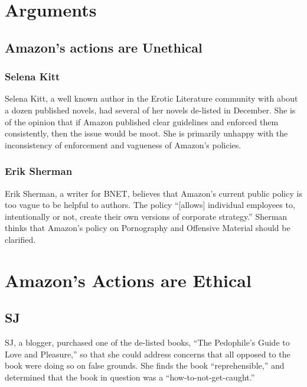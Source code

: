 \documentclass[11pt]{article}
\begin{document}
\begin{multicols}{2}

\section{Arguments}

\subsection{Amazon's actions are Unethical}

\subsubsection{Selena Kitt}
Selena Kitt, a well known author in the Erotic Literature community with about a dozen published novels, had several of her novels de-listed in December.  She is of the opinion that if Amazon published clear guidelines and enforced them consistently, then the issue would be moot.  She is primarily unhappy with the inconsistency of enforcement and vagueness of Amazon's policies. \cite{KittSelfPubRevolution}

\subsubsection{Erik Sherman}
Erik Sherman, a writer for BNET, believes that Amazon's current public policy is too vague to be helpful to authors.  The policy  ``[allows] individual employees to, intentionally or not, create their own versions of corporate strategy.'' \cite{ShermanAmazonExecs} Sherman thinks that Amazon's policy on Pornography and Offensive Material should be clarified.

\section{Amazon's Actions are Ethical}
\subsection{SJ}
SJ, a blogger, purchased one of the de-listed books, ``The Pedophile's Guide to Love and Pleasure,'' so that she could address concerns that all opposed to the book were doing so on false grounds.  She finds the book ``reprehensible,'' and determined that the book in question was a ``how-to-not-get-caught.'' \cite{iasshole}

\end{multicols}
\end{document}
